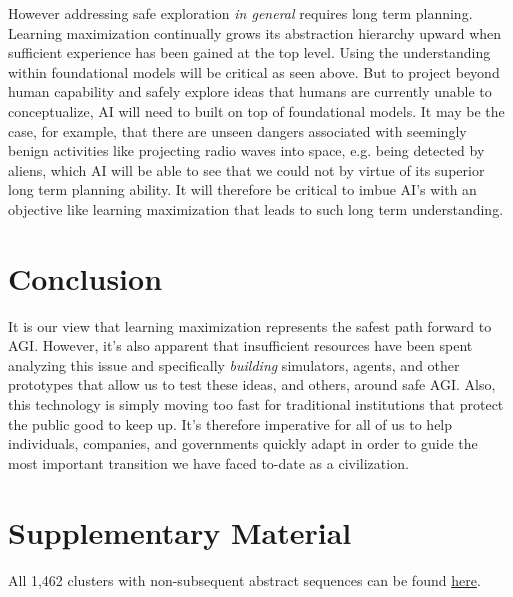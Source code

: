 \documentclass{article}
\begin{document}
However addressing safe exploration \emph{in general} requires long term planning. Learning maximization continually grows its abstraction hierarchy upward when sufficient experience has been gained at the top level. Using the understanding within foundational models will be critical as seen above. But to project beyond human capability and safely explore ideas that humans are currently unable to conceptualize, AI will need to built on top of foundational models. It may be the case, for example, that there are unseen dangers associated with seemingly benign activities like projecting radio waves into space, e.g. being detected by aliens, which AI will be able to see that we could not by virtue of its superior long term planning ability. It will therefore be critical to imbue AI's with an objective like learning maximization that leads to such long term understanding.

\section{Conclusion}

It is our view that learning maximization represents the safest path forward to AGI. However, it's also apparent that insufficient resources have been spent analyzing this issue and specifically \emph{building} simulators, agents, and other prototypes that allow us to test these ideas, and others, around safe AGI. Also, this technology is simply moving too fast for traditional institutions that protect the public good to keep up. It's therefore imperative for all of us to help individuals, companies, and governments quickly adapt in order to guide the most important transition we have faced to-date as a civilization.

\section{Supplementary Material}

All 1,462 clusters with non-subsequent abstract sequences can be found \href{https://bafybeidculspmycmrqjsloryhddesaqcvii22wywmorpr7hafvwcyldp3y.ipfs.w3s.link/}{here}.



\end{document}

